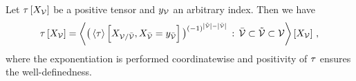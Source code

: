 \begin{lemma}
    \label{the:contractionFactorization}
    Let $\tau\left[X_{\mathcal{V}}\right]$ be a positive tensor and $y_{\mathcal{V}}$ an arbitrary index.
    Then we have
    \begin{align*}
        \tau\left[X_{\mathcal{V}}\right]
        = \left\langle 
            \big(\left\langle \tau\right\rangle \left[ X_{\mathcal{V}/\bar{\mathcal{V}}}, X_{\bar{\mathcal{V}}} = y_{\bar{\mathcal{V}}} \right]\big)^{(-1)^{\left|\tilde{\mathcal{V}}\right|-\left|\bar{\mathcal{V}}\right|}} \, : \, \bar{\mathcal{V}} \subset \tilde{\mathcal{V}} \subset \mathcal{V}
        \right\rangle \left[ X_{\mathcal{V}} \right] \, ,
    \end{align*}
    where the exponentiation is performed coordinatewise and positivity of $\tau$ ensures the well-definedness.
\end{lemma}
